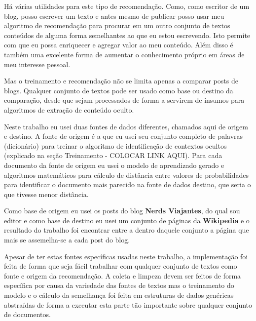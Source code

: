 Há várias utilidades para este tipo de recomendação. Como, como escritor de um blog, posso escrever um texto e antes mesmo de publicar posso usar 
meu algoritmo de recomendação para procurar em um outro conjunto de textos conteúdos de alguma forma semelhantes ao que eu estou escrevendo. 
Isto permite com que eu possa enriquecer e agregar valor ao meu conteúdo. Além disso é também uma excelente forma de aumentar o conhecimento 
próprio em áreas de meu interesse pessoal.

Mas o treinamento e recomendação não se limita apenas a comparar posts de blogs. Qualquer conjunto de textos pode ser usado como base ou destino 
da comparação, desde que sejam processados de forma a servirem de insumos para algoritmos de extração de conteúdo oculto.

Neste trabalho eu usei duas fontes de dados diferentes, chamados aqui de origem e destino. A fonte de origem é a que eu usei seu conjunto completo de 
palavras (dicionário) para treinar o algoritmo de identificação de contextos ocultos (explicado na seção Treinamento - COLOCAR LINK AQUI). 
Para cada documento da fonte de origem eu usei o modelo de aprendizado gerado e algoritmos matemáticos para cálculo de distância entre valores de 
probabilidades para identificar o documento mais parecido na fonte de dados destino, que seria o que tivesse menor distância.

Como base de origem eu usei os posts do blog \textbf{Nerds Viajantes}, do qual sou editor e como base de destino eu usei um conjunto de páginas 
da \textbf{Wikipedia} e o resultado do trabalho foi encontrar entre a dentro daquele conjunto a página que mais se assemelha-se a cada post do blog.

Apesar de ter estas fontes específicas usadas neste trabalho, a implementação foi feita de forma que seja fácil trabalhar com qualquer conjunto de 
textos como fonte e origem da recomendação. A coleta e limpeza devem ser feitos de forma específica por causa da variedade das fontes de textos mas o 
treinamento do modelo e o cálculo da semelhança foi feita em estruturas de dados genéricas abstraídas de forma a executar esta parte tão importante 
sobre qualquer conjunto de documentos.   
